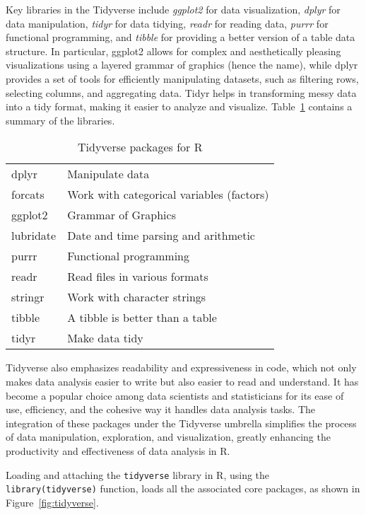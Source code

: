 Key libraries in the Tidyverse include \emph{ggplot2} for data visualization, \emph{dplyr} for data manipulation, \emph{tidyr} for data tidying, \emph{readr} for reading data, \emph{purrr} for functional programming, and \emph{tibble} for providing a better version of a table data structure. In particular, ggplot2 allows for complex and aesthetically pleasing visualizations using a layered grammar of graphics (hence the name), while dplyr provides a set of tools for efficiently manipulating datasets, such as filtering rows, selecting columns, and aggregating data. Tidyr helps in transforming messy data into a tidy format, making it easier to analyze and visualize. Table~\ref{tab:tidyverse} contains a summary of the libraries.

\begin{table}
\centering

\renewcommand{\arraystretch}{1.25}
\begin{tabular}{l|l} \hline
dplyr & Manipulate data \\
forcats & Work with categorical variables (factors) \\
ggplot2 & Grammar of Graphics \\
lubridate & Date and time parsing and arithmetic \\
purrr & Functional programming \\
readr & Read files in various formats \\
stringr & Work with character strings \\
tibble & A tibble is better than a table \\
tidyr & Make data tidy \\ \hline
\end{tabular}
\caption{Tidyverse packages for R}
\label{tab:tidyverse}
\end{table}

Tidyverse also emphasizes readability and expressiveness in code, which not only makes data analysis easier to write but also easier to read and understand. It has become a popular choice among data scientists and statisticians for its ease of use, efficiency, and the cohesive way it handles data analysis tasks. The integration of these packages under the Tidyverse umbrella simplifies the process of data manipulation, exploration, and visualization, greatly enhancing the productivity and effectiveness of data analysis in R.

Loading and attaching the \texttt{tidyverse} library in R, using the \texttt{library(tidyverse)} function, loads all the associated core packages, as shown in Figure~\ref{fig:tidyverse}.


